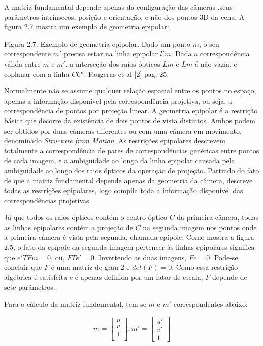 A matriz fundamental depende apenas da configuração das câmeras ,seus parâmetros intrínsecos, posição e orientação, e não dos pontos 3D da cena. A figura 2.7 mostra um exemplo de geometria epipolar:

Figura 2.7: Exemplo de geometria epipolar. Dado um ponto $m$, o seu correspondente $m'$ precisa estar na linha epipolar $l'm$. Dada a correspondência válida entre $m$ e $m'$, a interseção dos raios ópticos $Lm$ e $Lm$ é não-vazia, e coplanar com a linha $CC'$. Faugeras et al [2] pag. 25.

Normalmente não se assume qualquer relação espacial entre os pontos no espaço, apenas a informação disponível pela correspondência projetiva, ou seja, a correspondência de pontos por projeção linear. A geometria epipolar é a restrição básica que decorre da existência de dois pontos de vista distintos. Ambos podem ser obtidos por duas câmeras diferentes ou com uma câmera em movimento, denominado \textit{Structure from Motion}. As restrições epipolares descrevem totalmente a correspondência de pares de correspondências genéricas entre pontos de cada imagem, e a ambiguidade ao longo da linha epipolar causada pela ambiguidade ao longo dos raios ópticos da operação de projeção. Partindo do fato de que a matriz fundamental depende apenas da geometria da câmera, descreve todas as restrições epipolares, logo compila toda a informação disponível das correspondências projetivas. 

Já que todos os raios ópticos contém o centro óptico $C$ da primeira câmera, todas as linhas epipolares contém a projeção de $C$ na segunda imagem nos pontos onde a primeira câmera é vista pela segunda, chamada epípole. Como mostra a figura 2.5, o fato da epípole  da segunda imagem pertencer às linhas epipolares significa que $e'TFm = 0$, ou, $FTe' = 0$. Invertendo as duas imagens, $Fe = 0$. Pode-se concluir que $F$ é uma matriz de grau 2 e $det(F) = 0$. Como essa restrição algébrica é satisfeita e é apenas definida por um fator de escala, $F$ depende de sete parâmetros.

Para o cálculo da matriz fundamental, tem-se $m$ e $m'$ correspondentes abaixo:

$$
m = \begin{bmatrix}u\\v\\1\\ \end{bmatrix}, m' = \begin{bmatrix}u'\\v'\\1\end{bmatrix}
$$

